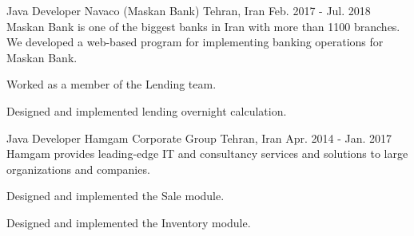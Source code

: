 \begin{cventries}
  \cventry
    {Java Developer} %
    {Navaco (Maskan Bank)} %
    {Tehran, Iran} %
    {Feb. 2017 - Jul. 2018} %
    {
      Maskan Bank is one of the biggest banks in Iran with more than 1100 branches.
      We developed a web-based program for implementing banking operations for Maskan Bank.
    }
    {
      \begin{cvitems} %
        \item {Worked as a member of the Lending team.}
        \item {Designed and implemented lending overnight calculation.}
      \end{cvitems}
    }

  \cventry
    {Java Developer} %
    {Hamgam Corporate Group} %
    {Tehran, Iran} %
    {Apr. 2014 - Jan. 2017} %
    {
      Hamgam provides leading-edge IT and consultancy services and solutions to large organizations and companies.
    }
    {
      \begin{cvitems} %
        \item {Designed and implemented the Sale module.}
        \item {Designed and implemented the Inventory module.}
      \end{cvitems}
    }

\end{cventries}
